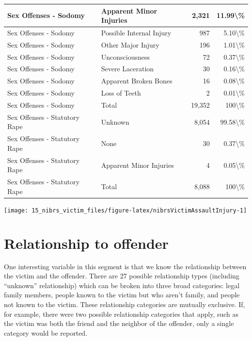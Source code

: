 \documentclass[
]{krantz}
\let\origfigure\figure
\let\endorigfigure\endfigure
\renewenvironment{figure}[1][2] {
    \expandafter\origfigure\expandafter[H]
} {
    \endorigfigure
}
\begin{document}
\begin{longtable}[t]{l|l|r|r}
\hline
Sex Offenses - Sodomy & Apparent Minor Injuries & 2,321 & 11.99\textbackslash{}\%\\
\hline
Sex Offenses - Sodomy & Possible Internal Injury & 987 & 5.10\textbackslash{}\%\\
\hline
Sex Offenses - Sodomy & Other Major Injury & 196 & 1.01\textbackslash{}\%\\
\hline
Sex Offenses - Sodomy & Unconsciousness & 72 & 0.37\textbackslash{}\%\\
\hline
Sex Offenses - Sodomy & Severe Laceration & 30 & 0.16\textbackslash{}\%\\
\hline
Sex Offenses - Sodomy & Apparent Broken Bones & 16 & 0.08\textbackslash{}\%\\
\hline
Sex Offenses - Sodomy & Loss of Teeth & 2 & 0.01\textbackslash{}\%\\
\hline
Sex Offenses - Sodomy & Total & 19,352 & 100\textbackslash{}\%\\
\hline
Sex Offenses - Statutory Rape & Unknown & 8,054 & 99.58\textbackslash{}\%\\
\hline
Sex Offenses - Statutory Rape & None & 30 & 0.37\textbackslash{}\%\\
\hline
Sex Offenses - Statutory Rape & Apparent Minor Injuries & 4 & 0.05\textbackslash{}\%\\
\hline
Sex Offenses - Statutory Rape & Total & 8,088 & 100\textbackslash{}\%\\
\hline
\end{longtable}

\begin{figure}

{\centering \texttt{[image: 15\_nibrs\_victim\_files/figure-latex/nibrsVictimAssaultInjury-1]} 

}

\caption{Victim injury for assault offenses, by injury severity, 1991-2023. Major injury is all injury types other than 'none' and 'apparent minor injuries' which are 'other major injury,' 'severe laceration,' possible internal injury,' apparent broken bones,' 'unconsciousness,' and 'loss of teeth.'}\label{fig:nibrsVictimAssaultInjury}
\end{figure}

\section{Relationship to
offender}\label{relationship-to-offender}

One interesting variable in this segment is that we know the
relationship between the victim and the offender. There are
27 possible relationship types (including ``unknown''
relationship) which can be broken into three broad
categories: legal family members, people known to the victim
but who aren't family, and people not known to the victim.
These relationship categories are mutually exclusive. If,
for example, there were two possible relationship categories
that apply, such as the victim was both the friend and the
neighbor of the offender, only a single category would be
reported.
\end{document}
